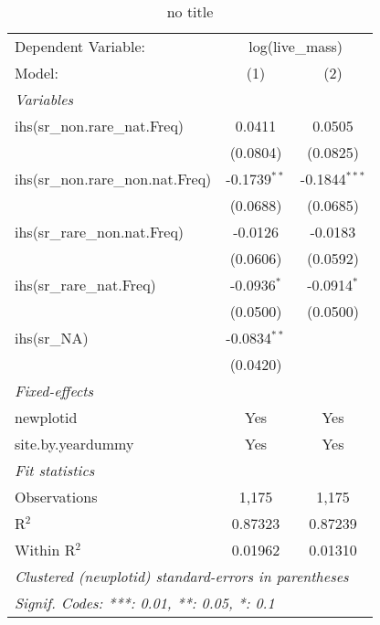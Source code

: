 
\begin{table}[htbp]
   \caption{no title}
   \centering
   \begin{tabular}{lcc}
      \tabularnewline \midrule \midrule
      Dependent Variable: & \multicolumn{2}{c}{log(live\_mass)}\\
      Model:                            & (1)            & (2)\\  
      \midrule
      \emph{Variables}\\
      ihs(sr\_non.rare\_nat.Freq)       & 0.0411         & 0.0505\\   
                                        & (0.0804)       & (0.0825)\\   
      ihs(sr\_non.rare\_non.nat.Freq)   & -0.1739$^{**}$ & -0.1844$^{***}$\\   
                                        & (0.0688)       & (0.0685)\\   
      ihs(sr\_rare\_non.nat.Freq)       & -0.0126        & -0.0183\\   
                                        & (0.0606)       & (0.0592)\\   
      ihs(sr\_rare\_nat.Freq)           & -0.0936$^{*}$  & -0.0914$^{*}$\\   
                                        & (0.0500)       & (0.0500)\\   
      ihs(sr\_NA)                       & -0.0834$^{**}$ &   \\   
                                        & (0.0420)       &   \\   
      \midrule
      \emph{Fixed-effects}\\
      newplotid                         & Yes            & Yes\\  
      site.by.yeardummy                 & Yes            & Yes\\  
      \midrule
      \emph{Fit statistics}\\
      Observations                      & 1,175          & 1,175\\  
      R$^2$                             & 0.87323        & 0.87239\\  
      Within R$^2$                      & 0.01962        & 0.01310\\  
      \midrule \midrule
      \multicolumn{3}{l}{\emph{Clustered (newplotid) standard-errors in parentheses}}\\
      \multicolumn{3}{l}{\emph{Signif. Codes: ***: 0.01, **: 0.05, *: 0.1}}\\
   \end{tabular}
\end{table}


